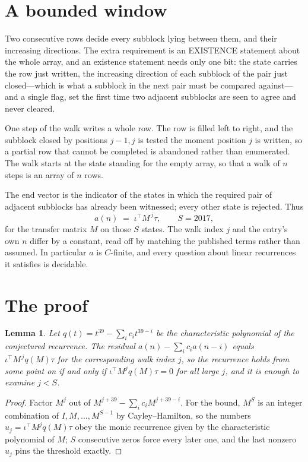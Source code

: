 \documentclass[11pt,a4paper]{article}
\theoremstyle{plain}
\newtheorem{lemma}[theorem]{Lemma}
\theoremstyle{definition}
\begin{document}
\section{A bounded window}

Two consecutive rows decide every subblock lying between them, and their increasing directions. The extra requirement is an EXISTENCE statement about the whole array, and an existence statement needs only one bit: the state carries the row just written, the increasing direction of each subblock of the pair just closed---which is what a subblock in the next pair must be compared against---and a single flag, set the first time two adjacent subblocks are seen to agree and never cleared.

One step of the walk writes a whole row. The row is filled left to right, and the subblock
closed by positions $j-1,j$ is tested the moment position $j$ is written, so a partial row that
cannot be completed is abandoned rather than enumerated. The walk starts at the state standing
for the empty array, so that a walk of $n$ steps is an array of $n$ rows.

The end vector is the indicator of the states in which the required pair of adjacent subblocks has already been witnessed; every other state is rejected. Thus
\[
a(n)\;=\;\iota^{\!\top}M^{\,j}\tau ,\qquad S=2017,
\]
for the transfer matrix $M$ on those $S$ states. The walk index $j$ and the entry's own $n$
differ by a constant, read off by matching the published terms rather than assumed. In
particular $a$ is $C$-finite, and every question about linear recurrences it satisfies is
decidable.

\section{The proof}

\begin{lemma}\label{lem:crit}
Let $q(t)=t^{39}-\sum_i c_it^{39-i}$ be the characteristic polynomial of the
conjectured recurrence. The residual $a(n)-\sum_ic_ia(n-i)$ equals
$\iota^{\!\top}M^{\,j}q(M)\tau$ for the corresponding walk index $j$, so the recurrence
holds from some point on if and only if $\iota^{\!\top}M^{j}q(M)\tau=0$ for all large $j$,
and it is enough to examine $j<S$.
\end{lemma}

\begin{proof}
Factor $M^{j}$ out of $M^{j+39}-\sum_ic_iM^{j+39-i}$. For the bound, $M^{S}$
is an integer combination of $I,M,\dots,M^{S-1}$ by Cayley--Hamilton, so the numbers
$u_j=\iota^{\!\top}M^{j}q(M)\tau$ obey the monic recurrence given by the characteristic
polynomial of $M$; $S$ consecutive zeros force every later one, and the last nonzero $u_j$
pins the threshold exactly.
\end{proof}
\end{document}

